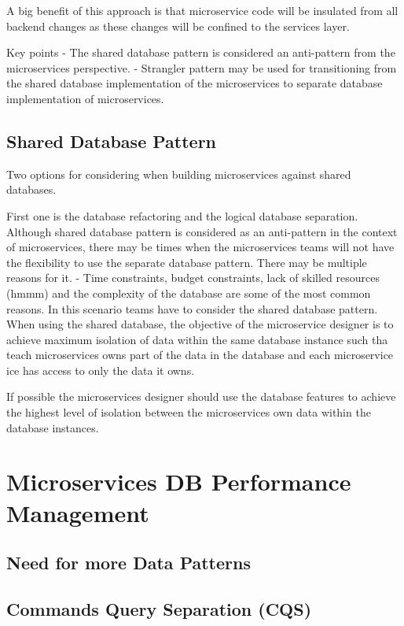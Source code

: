 A big benefit of this approach is that microservice code will be insulated from all backend changes as these changes will be confined to the services layer.

Key points
- The shared database pattern is considered an anti-pattern from the microservices perspective.
- Strangler pattern may be used for transitioning from the shared database implementation of the microservices to separate database implementation of microservices.

\section{Shared Database Pattern}
Two options for considering when building microservices against shared databases.

First one is the database refactoring and the logical database separation.
Although shared database pattern is considered as an anti-pattern in the context of microservices, there may be times when the microservices teams will not have the flexibility to use the separate database pattern.
There may be multiple reasons for it.
- Time constraints, budget constraints, lack of skilled resources (hmmm) and the complexity of the database are some of the most common reasons.
In this scenario teams have to consider the shared database pattern.
When using the shared database, the objective of the microservice designer is to achieve maximum isolation of data within the same database instance such tha teach microservices owns part of the data in the database and each microservice ice has access to only the data it owns.

If possible the microservices designer should use the database features to achieve the highest level of isolation between the microservices own data within the database instances.

\chapter{Microservices DB Performance Management}
\section{Need for more Data Patterns}

\section{Commands Query Separation (CQS)}

